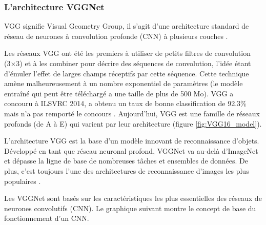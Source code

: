 	
	
		
	\subsubsection{\textbf{L'architecture VGGNet}}\label{subsec:vggnet}
	
	VGG signifie Visual Geometry Group, il s'agit d'une architecture standard de réseau de neurones à convolution profonde (CNN) à plusieurs couches \cite{simonyan2014very}. %
	
	Les réseaux VGG ont été les premiers à utiliser de petits filtres de convolution (3×3) et à les combiner pour décrire des séquences de convolution, l'idée étant d'émuler l'effet de larges champs réceptifs par cette séquence. Cette technique amène malheureusement à un nombre exponentiel de paramètres (le modèle entraîné qui peut être téléchargé a une taille de plus de 500 Mo). VGG a concouru à ILSVRC 2014, a obtenu un taux de bonne classification de 92.3\% mais n'a pas remporté le concours \cite{krizhevsky2012imagenet}. Aujourd'hui, VGG est une famille de réseaux profonds (de A à E) qui varient par leur architecture (figure \ref{fig:VGG16_model}). %
	
	L'architecture VGG est  la base d'un modèle innovant de reconnaissance d'objets. Développé en tant que réseau neuronal profond, VGGNet va au-delà d'ImageNet et dépasse la ligne de base  de nombreuses tâches et ensembles de données. De plus, c'est toujours l'une des architectures de reconnaissance d'images les plus populaires \cite{tammina2019transfer, antoine2018apprentissage}.
	
	Les VGGNet sont basés sur les caractéristiques les plus essentielles des réseaux de neurones convolutifs (CNN). Le graphique suivant montre le concept de base du fonctionnement d'un CNN.
	
